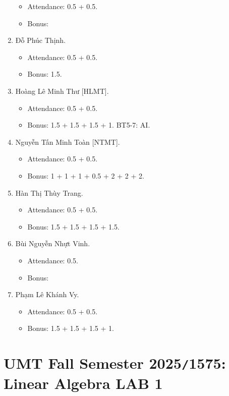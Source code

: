 \documentclass{article}
\begin{document}
\begin{enumerate}
    \begin{itemize}
        \item Attendance: 0.5 + 0.5.
        \item Bonus:
    \end{itemize}
    \item {\sc Đỗ Phúc Thịnh.}
    \begin{itemize}
        \item Attendance: 0.5 + 0.5.
        \item Bonus: 1.5.
    \end{itemize}
    \item {\sc Hoàng Lê Minh Thư [HLMT].}
    \begin{itemize}
        \item Attendance: 0.5 + 0.5.
        \item Bonus: 1.5 + 1.5 + 1.5 + 1. BT5-7: AI.
    \end{itemize}
    \item {\sc Nguyễn Tấn Minh Toàn [NTMT].}
    \begin{itemize}
        \item Attendance: 0.5 + 0.5.
        \item Bonus: 1 + 1 + 1 + 0.5 + 2 + 2 + 2.
    \end{itemize}
    \item {\sc Hàn Thị Thùy Trang.}
    \begin{itemize}
        \item Attendance: 0.5 + 0.5.
        \item Bonus: 1.5 + 1.5 + 1.5 + 1.5.
    \end{itemize}
    \item {\sc Bùi Nguyễn Nhựt Vinh.}
    \begin{itemize}
        \item Attendance: 0.5.
        \item Bonus:
    \end{itemize}
    \item {\sc Phạm Lê Khánh Vy.}
    \begin{itemize}
        \item Attendance: 0.5 + 0.5.
        \item Bonus: 1.5 + 1.5 + 1.5 + 1.
    \end{itemize}
\end{enumerate}


\section{UMT Fall Semester 2025{\tt/}1575: Linear Algebra LAB 1}
\end{document}
